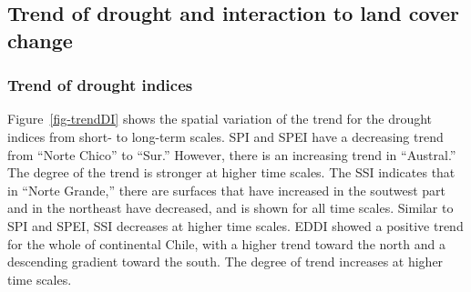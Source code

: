 \documentclass[
  authoryear,
  preprint,
  3p,
  onecolumn]{elsarticle}
\begin{document}
\hypertarget{trend-of-drought-and-interaction-to-land-cover-change-1}{%
\subsection{Trend of drought and interaction to land cover
change}\label{trend-of-drought-and-interaction-to-land-cover-change-1}}

\hypertarget{trend-of-drought-indices-1}{%
\subsubsection{Trend of drought
indices}\label{trend-of-drought-indices-1}}

Figure~\ref{fig-trendDI} shows the spatial variation of the trend for
the drought indices from short- to long-term scales. SPI and SPEI have a
decreasing trend from ``Norte Chico'' to ``Sur.'' However, there is an
increasing trend in ``Austral.'' The degree of the trend is stronger at
higher time scales. The SSI indicates that in ``Norte Grande,'' there
are surfaces that have increased in the soutwest part and in the
northeast have decreased, and is shown for all time scales. Similar to
SPI and SPEI, SSI decreases at higher time scales. EDDI showed a
positive trend for the whole of continental Chile, with a higher trend
toward the north and a descending gradient toward the south. The degree
of trend increases at higher time scales.

\blandscape
\end{document}
